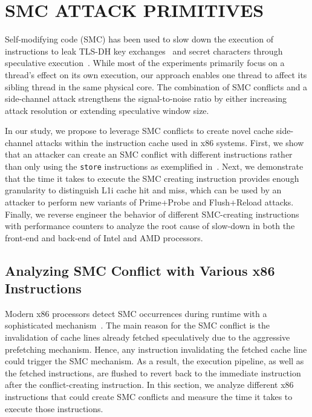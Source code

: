 \section{SMC ATTACK PRIMITIVES}\label{sec:SMCAttack}

Self-modifying code (SMC) has been used to slow down the execution of instructions to leak TLS-DH key exchanges~\cite{aldaya2022hyperdegrade} and secret characters through speculative execution~\cite{ragab2021rage}. 
%
While most of the experiments primarily focus on a thread's effect on its own execution, our approach enables one thread to affect its sibling thread in the same physical core.
%
The combination of SMC conflicts and a side-channel attack strengthens the signal-to-noise ratio by either increasing attack resolution or extending speculative window size. 

In our study, we propose to leverage SMC conflicts to create novel cache side-channel attacks within the instruction cache used in x86 systems. First, we show that an attacker can create an SMC conflict with different instructions rather than only using the \texttt{store}
instructions as exemplified in~\cite{ragab2021rage}. Next, we demonstrate that the time it takes to execute the SMC creating instruction provides enough granularity to distinguish L1i cache hit and miss, which can be used by an attacker to perform new variants of Prime+Probe and Flush+Reload attacks. Finally, we reverse engineer the behavior of different SMC-creating instructions with performance counters to analyze the root cause of slow-down in both the front-end and back-end of Intel and AMD processors.

\subsection{Analyzing SMC Conflict with Various x86 Instructions}
Modern x86 processors detect SMC occurrences during runtime with a sophisticated mechanism~\cite{kyker2003method,self_amd}. 
The main reason for the SMC conflict is the invalidation of cache lines already fetched speculatively due to the aggressive prefetching mechanism.
Hence, any instruction invalidating the fetched cache line could trigger the SMC mechanism. 
As a result, the execution pipeline, as well as the fetched instructions, are flushed to revert back to the immediate instruction after the conflict-creating instruction. 
In this section, we analyze different x86 instructions that could create SMC conflicts and measure the time it takes to execute those instructions. 

